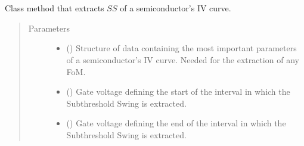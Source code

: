 \documentclass[letterpaper,10pt,english,openany, oneside]{sphinxmanual}
\begin{document}
\begin{fulllineitems}
\label{\detokenize{index:fompy.fom.ss_ext}}~

\begin{fulllineitems}
\label{\detokenize{index:fompy.fom.ss_ext.extraction}}~

\begin{fulllineitems}
Class method that extracts \(SS\) of a semiconductor’s IV curve.

\end{fulllineitems}

\begin{quote}\begin{description}
\item[{Parameters}] \leavevmode\begin{itemize}
\item {} 
 () \textendash{} Structure of data containing the most important parameters of a semiconductor’s IV curve.
Needed for the extraction of any FoM.

\item {} 
 () \textendash{} Gate voltage defining the start of the interval in which the Subthreshold Swing is extracted.

\item {} 
 () \textendash{} Gate voltage defining the end of the interval in which the Subthreshold Swing is extracted.

\end{itemize}

\end{description}\end{quote}

\end{fulllineitems}


\end{fulllineitems}
\end{document}
